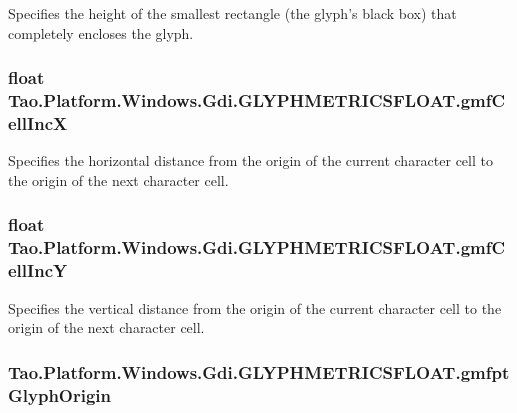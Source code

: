 Specifies the height of the smallest rectangle (the glyph's black box) that completely encloses the glyph. 

\hypertarget{struct_tao_1_1_platform_1_1_windows_1_1_gdi_1_1_g_l_y_p_h_m_e_t_r_i_c_s_f_l_o_a_t_a987aa1f6885a5fa2d4907c570b09f156}{
\subsubsection[{gmfCellIncX}]{\setlength{\rightskip}{0pt plus 5cm}float {\bf Tao.Platform.Windows.Gdi.GLYPHMETRICSFLOAT.gmfCellIncX}}}
\label{struct_tao_1_1_platform_1_1_windows_1_1_gdi_1_1_g_l_y_p_h_m_e_t_r_i_c_s_f_l_o_a_t_a987aa1f6885a5fa2d4907c570b09f156}


Specifies the horizontal distance from the origin of the current character cell to the origin of the next character cell. 

\hypertarget{struct_tao_1_1_platform_1_1_windows_1_1_gdi_1_1_g_l_y_p_h_m_e_t_r_i_c_s_f_l_o_a_t_a7170e3044ace825b72567b01c841da43}{
\subsubsection[{gmfCellIncY}]{\setlength{\rightskip}{0pt plus 5cm}float {\bf Tao.Platform.Windows.Gdi.GLYPHMETRICSFLOAT.gmfCellIncY}}}
\label{struct_tao_1_1_platform_1_1_windows_1_1_gdi_1_1_g_l_y_p_h_m_e_t_r_i_c_s_f_l_o_a_t_a7170e3044ace825b72567b01c841da43}


Specifies the vertical distance from the origin of the current character cell to the origin of the next character cell. 

\hypertarget{struct_tao_1_1_platform_1_1_windows_1_1_gdi_1_1_g_l_y_p_h_m_e_t_r_i_c_s_f_l_o_a_t_a0def46e14c407a631292afe9da30dbd6}{
\subsubsection[{gmfptGlyphOrigin}]{ {\bf Tao.Platform.Windows.Gdi.GLYPHMETRICSFLOAT.gmfptGlyphOrigin}}}
\label{struct_tao_1_1_platform_1_1_windows_1_1_gdi_1_1_g_l_y_p_h_m_e_t_r_i_c_s_f_l_o_a_t_a0def46e14c407a631292afe9da30dbd6}


